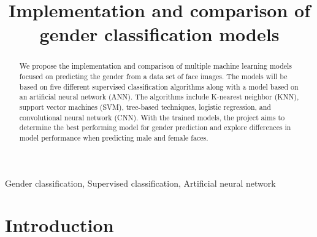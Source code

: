 \documentclass[conference]{IEEEtran}
\begin{document}
\title{Implementation and comparison of gender classification models \\
}

\author{
}

\maketitle

\begin{abstract}
We propose the implementation and comparison of multiple machine learning models focused on predicting the gender from a data set of face images. The models will be based on five different supervised classification algorithms along with a model based on an artificial neural network (ANN). The algorithms include K-nearest neighbor (KNN), support vector machines (SVM), tree-based techniques, logistic regression, and convolutional neural network (CNN). With the trained models, the project aims to determine the best performing model for gender prediction and explore differences in model performance when predicting male and female faces.
\end{abstract}

\begin{IEEEkeywords}
Gender classification, Supervised classification, Artificial neural network
\end{IEEEkeywords}

\section{Introduction}
\end{document}
